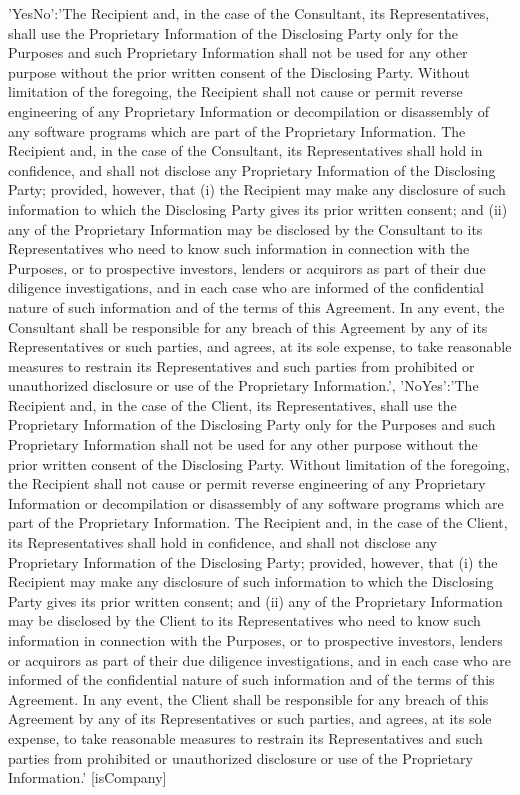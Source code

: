 \documentclass[12pt]{article}
\begin{document}
{{        'YesNo':'The Recipient and, in the case of the Consultant, its Representatives, shall use the Proprietary Information of the Disclosing Party only for the Purposes and such Proprietary Information shall not be used for any other purpose without the prior written consent of the Disclosing Party. Without limitation of the foregoing, the Recipient shall not cause or permit reverse engineering of any Proprietary Information or decompilation or disassembly of any software programs which are part of the Proprietary Information. The Recipient and, in the case of the Consultant, its Representatives shall hold in confidence, and shall not disclose any Proprietary Information of the Disclosing Party; provided, however, that (i) the Recipient may make any disclosure of such information to which the Disclosing Party gives its prior written consent; and (ii) any of the Proprietary Information may be disclosed by the Consultant to its Representatives who need to know such information in connection with the Purposes, or to prospective investors, lenders or acquirors as part of their due diligence investigations, and in each case who are informed of the confidential nature of such information and of the terms of this Agreement. In any event, the Consultant shall be responsible for any breach of this Agreement by any of its Representatives or such parties, and agrees, at its sole expense, to take reasonable measures to restrain its Representatives and such parties from prohibited or unauthorized disclosure or use of the Proprietary Information.',
        'NoYes':'The Recipient and, in the case of the Client, its Representatives, shall use the Proprietary Information of the Disclosing Party only for the Purposes and such Proprietary Information shall not be used for any other purpose without the prior written consent of the Disclosing Party. Without limitation of the foregoing, the Recipient shall not cause or permit reverse engineering of any Proprietary Information or decompilation or disassembly of any software programs which are part of the Proprietary Information. The Recipient and, in the case of the Client, its Representatives shall hold in confidence, and shall not disclose any Proprietary Information of the Disclosing Party; provided, however, that (i) the Recipient may make any disclosure of such information to which the Disclosing Party gives its prior written consent; and (ii) any of the Proprietary Information may be disclosed by the Client to its Representatives who need to know such information in connection with the Purposes, or to prospective investors, lenders or acquirors as part of their due diligence investigations, and in each case who are informed of the confidential nature of such information and of the terms of this Agreement. In any event, the Client shall be responsible for any breach of this Agreement by any of its Representatives or such parties, and agrees, at its sole expense, to take reasonable measures to restrain its Representatives and such parties from prohibited or unauthorized disclosure or use of the Proprietary Information.'
    }[isCompany]
}
\end{document}
